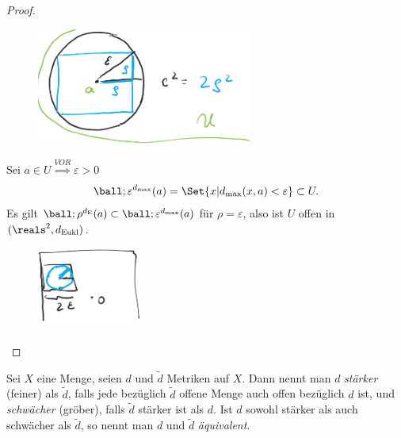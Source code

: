 \begin{beispiel*}
\begin{proof}
        \begin{figure}[H]
            \centering
            \includegraphics[width=0.5\linewidth]{figures/max_quadrat_in_eukl_kreis}
            \label{fig:max_quadrat_in_eukl_kreis}
        \end{figure}
        \item[\rueck] Sei \( a\in U \)\( \overset{VOR}{\implies} \)\texists \( \varepsilon>0 \) \sd
        \begin{align*}
            \ball;{\varepsilon}^{d_{\max}}(a)=\Set{x|d_{\max}(x,a)<\varepsilon}\subset U.
        \end{align*}
        Es gilt \( \ball;{\rho}^{d_{\text{E}}}(a)\subset \ball;{\varepsilon}^{d_{\max}}(a) \) für \( \rho=\varepsilon \), also ist \( U \) offen in \( (\reals^2,d_{\text{Eukl}}) \).
        \begin{figure}[H]
            \centering
            \includegraphics[width=0.4\linewidth]{figures/eukl_kreis_in_max_quadrat}
            \label{fig:eukl_kreis_in_max_quadrat}
        \end{figure}
        
    \end{proof}
    
\end{beispiel*}
\begin{definition}
    Sei \( X \) eine Menge, seien \( d \) und \( \tilde{d} \) Metriken auf \( X \). Dann nennt man \( d \) \emph{stärker} (feiner) als \( \tilde{d} \), falls jede bezüglich \( \tilde{d} \) offene Menge auch offen bezüglich \( d \) ist, und \emph{schwächer} (gröber), falls \( \tilde{d} \) stärker ist als \( d \). Ist \( d \) sowohl stärker als auch schwächer als \( \tilde{d} \), so nennt man \( d \) und \( \tilde{d} \) \emph{äquivalent}.
\end{definition}
